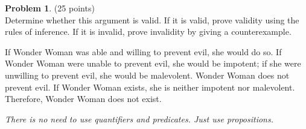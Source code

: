 \documentclass{article}
\theoremstyle{definition}
\newtheorem{problem}{Problem}
\begin{document}
\newpage

\begin{problem} (25 points)\\
Determine whether this argument is valid.  If it is valid, prove validity using the rules of inference.  If it is invalid, prove invalidity by giving a counterexample.
\begin{displayquote}
If Wonder Woman was able and willing to prevent evil, she would do so.  If Wonder Woman were unable to prevent evil, she would be impotent; if she were unwilling to prevent evil, she would be malevolent.  Wonder Woman does not prevent evil.  If Wonder Woman exists, she is neither impotent nor malevolent.  Therefore, Wonder Woman does not exist.
\end{displayquote}
\textit{There is no need to use quantifiers and predicates.  Just use propositions.}
\end{problem}
\end{document}
